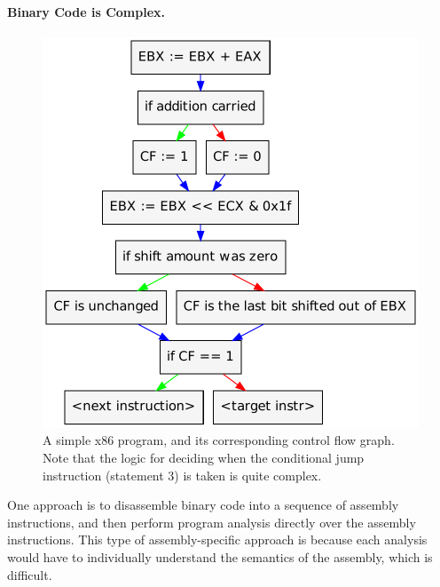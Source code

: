 \paragraph{Binary Code is Complex.}

\begin{figure}
\centering
\begin{minipage}{.4\linewidth}

\end{minipage}
\begin{minipage}[c]{.5\linewidth}
\includegraphics[width=\linewidth]{fig/add-shl}
\end{minipage}
\caption{A simple x86 program, and its corresponding control flow
  graph.  Note that the logic for deciding when the conditional jump
  instruction (statement 3) is taken is quite complex. }
\label{vine:shl-add}
\end{figure}

One approach is to disassemble binary code into a sequence of assembly
instructions, and then perform program analysis directly over the
assembly instructions.  This type of assembly-specific approach is
\naive because each analysis would have to individually understand the
semantics of the assembly, which is difficult.


